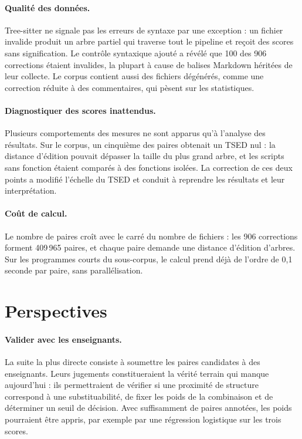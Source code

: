 \documentclass[12pt,a4paper,oneside]{report}
\begin{document}
\paragraph{Qualité des données.}
Tree-sitter ne signale pas les erreurs de syntaxe par une exception : un
fichier invalide produit un arbre partiel qui traverse tout le pipeline et
reçoit des scores sans signification. Le contrôle syntaxique ajouté a
révélé que 100 des 906 corrections étaient invalides, la plupart à cause
de balises Markdown héritées de leur collecte. Le corpus contient aussi des
fichiers dégénérés, comme une correction réduite à des commentaires, qui
pèsent sur les statistiques.

\paragraph{Diagnostiquer des scores inattendus.}
Plusieurs comportements des mesures ne sont apparus qu'à l'analyse des
résultats. Sur le corpus, un cinquième des paires obtenait un TSED nul : la
distance d'édition pouvait dépasser la taille du plus grand arbre, et les
scripts sans fonction étaient comparés à des fonctions isolées. La
correction de ces deux points a modifié l'échelle du TSED et conduit à
reprendre les résultats et leur interprétation.

\paragraph{Coût de calcul.}
Le nombre de paires croît avec le carré du nombre de fichiers : les 906
corrections forment 409\,965 paires, et chaque paire demande une distance
d'édition d'arbres. Sur les programmes courts du sous-corpus, le calcul
prend déjà de l'ordre de 0,1 seconde par paire, sans parallélisation.

\section{Perspectives}

\paragraph{Valider avec les enseignants.}
La suite la plus directe consiste à soumettre les paires candidates à des
enseignants. Leurs jugements constitueraient la vérité terrain qui manque
aujourd'hui : ils permettraient de vérifier si une proximité de structure
correspond à une substituabilité, de fixer les poids de la combinaison et
de déterminer un seuil de décision. Avec suffisamment de paires annotées,
les poids pourraient être appris, par exemple par une régression
logistique sur les trois scores.
\end{document}
